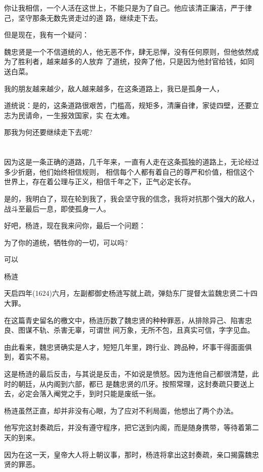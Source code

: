 \documentclass[11pt,a4paper,onecolumn]{article}
\begin{document}
你让我相信，一个人活在这世上，不能只是为了自己。他应该清正廉洁，严于律己，坚守那条无数先贤走过的道
路，继续走下去。

但是现在，我有一个疑问：

魏忠贤是一个不信道统的人，他无恶不作，肆无忌惮，没有任何原则，但他依然成为了胜利者，越来越多的人放弃
了道统，投奔了他，只是因为他封官给钱，如同送白菜。

我的朋友越来越少，敌人越来越多，在这条道路上，我已是孤身一人，

道统说：是的，这条道路很艰苦，门槛高，规矩多，清廉自律，家徒四壁，还要立志为民请命，一生报效国家，实
在太难。

那我为何还要继续走下去呢?

\section[\thesection]{}

因为这是一条正确的道路，几千年来，一直有人走在这条孤独的道路上，无论经过多少折磨，他们始终相信规则，
相信每个人都有着自己的尊严和价值，相信这个世界上，存在着公理与正义，相信千年之下，正气必定长存。

是的，我明白了，现在轮到我了，我会坚守我的信念，我将对抗那个强大的敌人，战斗至最后一息，即使孤身一人。

好吧，杨涟，现在我来问你，最后一个问题：

为了你的道统，牺牲你的一切，可以吗?

可以

杨涟

天启四年(1624)六月，左副都御史杨涟写就上疏，弹劾东厂提督太监魏忠贤二十四大罪。

在这篇青史留名的檄文中，杨涟历数了魏忠贤的种种罪恶，从排除异己、陷害忠良、图谋不轨、杀害无辜，可谓世
间万象，无所不包，且真实可信，字字见血。

由此看来，魏忠贤确实是人才，短短几年里，跨行业、跨品种，坏事干得面面俱到，着实不易。

这是杨涟的最后反击，与其说是反击，不如说是愤怒。因为连他自己都很清楚，此时的朝廷，从内阁到六部，都已
是魏忠贤的爪牙。按照常理，这封奏疏只要送上去，必定会落入阉党之手，到时只能是废纸一张。

杨涟虽然正直，却并非没有心眼，为了应对不利局面，他想出了两个办法。

他写完这封奏疏后，并没有遵守程序，把它送到内阁，而是随身携带，等待着第二天的到来。

因为在这一天，皇帝大人将上朝议事，那时，杨涟将拿出这封奏疏，亲口揭露魏忠贤的罪恶。
\end{document}
